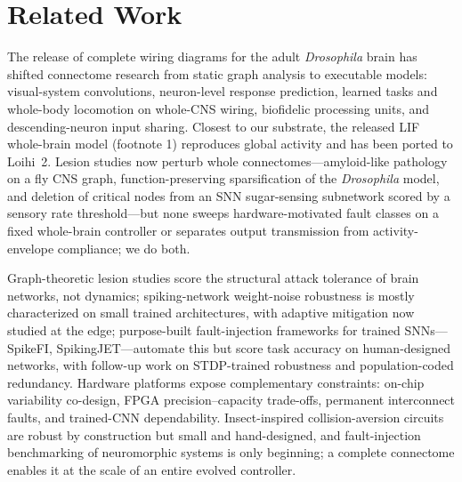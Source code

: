 \section{Related Work}
The release of complete wiring diagrams for the adult \emph{Drosophila} brain\cite{lin2024network} has shifted connectome research from static graph analysis to executable models: visual-system convolutions\cite{liew2026connectomebased}, neuron-level response prediction\cite{xie2025visual}, learned tasks and whole-body locomotion on whole-CNS wiring\cite{cho2026drosophila,senge2026connectome,jin2026wholebrain}, biofidelic processing units\cite{yu2025biological}, and descending-neuron input sharing\cite{zhang2026synaptic,drummond2026population}. Closest to our substrate, the released LIF whole-brain model (footnote 1) reproduces global activity and has been ported to Loihi~2\cite{wang2025neuromorphic}. Lesion studies now perturb whole connectomes---amyloid-like pathology on a fly CNS graph\cite{jo2026simulating}, function-preserving sparsification of the \emph{Drosophila} model\cite{an2026sparse}, and deletion of critical nodes from an SNN sugar-sensing subnetwork scored by a sensory rate threshold\cite{adler2026latent}---but none sweeps hardware-motivated fault classes on a fixed whole-brain controller or separates output transmission from activity-envelope compliance; we do both.

Graph-theoretic lesion studies score the structural attack tolerance of brain networks\cite{aerts2016brain}, not dynamics; spiking-network weight-noise robustness is mostly characterized on small trained architectures\cite{thieu2022effects,yunusoglu2025neuromorphic}, with adaptive mitigation now studied at the edge\cite{luca2026learned}; purpose-built fault-injection frameworks for trained SNNs---SpikeFI\cite{spyrou2024spikefi}, SpikingJET\cite{gogebakan2024spikingjet}---automate this but score task accuracy on human-designed networks, with follow-up work on STDP-trained robustness and population-coded redundancy\cite{jouni2025stdptrained,gleyo2026population}. Hardware platforms expose complementary constraints: on-chip variability co-design\cite{arfa2025hardwareaware}, FPGA precision--capacity trade-offs\cite{gautam2025neurocorex}, permanent interconnect faults\cite{chessa2026crosslayer}, and trained-CNN dependability\cite{graciamorn2026dependability}. Insect-inspired collision-aversion circuits are robust by construction but small and hand-designed\cite{shuang2023opplod}, and fault-injection benchmarking of neuromorphic systems is only beginning\cite{yik2023neurobench,medvedeva2025formalizing}; a complete connectome enables it at the scale of an entire evolved controller.
